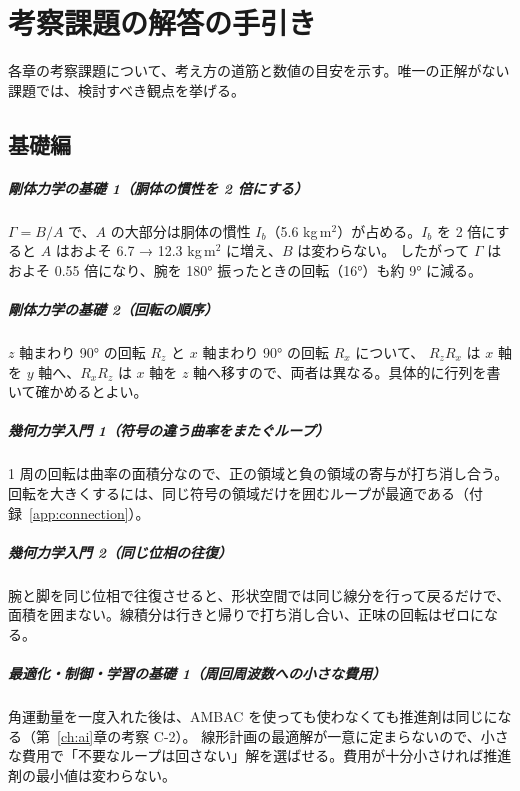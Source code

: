 \chapter{考察課題の解答の手引き}\label{app:answers}

各章の考察課題について、考え方の道筋と数値の目安を示す。唯一の正解がない課題では、検討すべき観点を挙げる。

\section{基礎編}

\paragraph{剛体力学の基礎 1（胴体の慣性を 2 倍にする）}
$\Gamma=B/A$ で、$A$ の大部分は胴体の慣性 $I_b$（5.6 kg\,m$^2$）が占める。$I_b$ を 2 倍にすると $A$ はおよそ 6.7 → 12.3 kg\,m$^2$ に増え、$B$ は変わらない。
したがって $\Gamma$ はおよそ 0.55 倍になり、腕を 180° 振ったときの回転（16°）も約 9° に減る。

\paragraph{剛体力学の基礎 2（回転の順序）}
$z$ 軸まわり 90° の回転 $R_z$ と $x$ 軸まわり 90° の回転 $R_x$ について、
$R_zR_x$ は $x$ 軸を $y$ 軸へ、$R_xR_z$ は $x$ 軸を $z$ 軸へ移すので、両者は異なる。具体的に行列を書いて確かめるとよい。

\paragraph{幾何力学入門 1（符号の違う曲率をまたぐループ）}
1 周の回転は曲率の面積分なので、正の領域と負の領域の寄与が打ち消し合う。回転を大きくするには、同じ符号の領域だけを囲むループが最適である（付録~\ref{app:connection}）。

\paragraph{幾何力学入門 2（同じ位相の往復）}
腕と脚を同じ位相で往復させると、形状空間では同じ線分を行って戻るだけで、面積を囲まない。線積分は行きと帰りで打ち消し合い、正味の回転はゼロになる。

\paragraph{最適化・制御・学習の基礎 1（周回周波数への小さな費用）}
角運動量を一度入れた後は、AMBAC を使っても使わなくても推進剤は同じになる（第~\ref{ch:ai}章の考察 C-2）。
線形計画の最適解が一意に定まらないので、小さな費用で「不要なループは回さない」解を選ばせる。費用が十分小さければ推進剤の最小値は変わらない。

